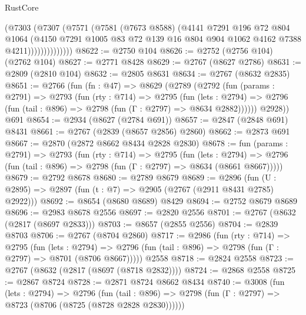 \begin{lexlean}{RustCore}
\begin{coremodule}
                    (@7303
                      (@7307
                        (@7571
                          (@7581
                            (@7673 @8588)
                            (@4141
                              @7291
                              @196
                              @72
                              @804
                              @1064
                              (@4150
                                @7291
                                @1005
                                @83
                                @72
                                @139
                                @16
                                @804
                                @904
                                @1062
                                @4162
                                @7388
                                @4211))))))))))))))
@8622 := @2750 @104
@8626 := @2752 (@2756 @104) (@2762 @104)
@8627 := @2771 @8428
@8629 := @2767 (@8627 @2786)
@8631 := @2809 (@2810 @104)
@8632 := @2805 @8631
@8634 := @2767 (@8632 @2835)
@8651 := @2766
    (fun (fn : @47) =>
    @8629
      (@2789
        (@2792
          (fun (params : @2791) =>
          @2793
            (fun (rty : @714) =>
            @2795
              (fun (lets : @2794) =>
              @2796 (fun (tail : @896) => @2798 (fun (Γ : @2797) => @8634 @2882))))))
        @2928))
    @691
@8654 := @2934 (@8627 (@2784 @691))
@8657 := @2847 (@2848 @691) @8431
@8661 := @2767 (@2839 (@8657 @2856) @2860)
@8662 := @2873 @691
@8667 := @2870 (@2872 @8662 @8434 @2828 @2830)
@8678 := fun (params : @2791) =>
  @2793
    (fun (rty : @714) =>
    @2795
      (fun (lets : @2794) =>
      @2796 (fun (tail : @896) => @2798 (fun (Γ : @2797) => @8634 (@8661 @8667)))))
@8679 := @2792 @8678
@8680 := @2789 @8679
@8689 := @2896 (fun (U : @2895) => @2897 (fun (t : @7) => @2905 (@2767 (@2911 @8431 @2785) @2922)))
@8692 := @8654 (@8680 @8689) @8429
@8694 := @2752 @8679 @8689
@8696 := @2983 @8678 @2556
@8697 := @2820 @2556
@8701 := @2767 (@8632 (@2817 (@8697 @2833)))
@8703 := @8657 (@2855 @2556)
@8704 := @2839 @8703
@8706 := @2767 (@8704 @2860)
@8717 := @2986
    (fun (rty : @714) =>
    @2795
      (fun (lets : @2794) =>
      @2796 (fun (tail : @896) => @2798 (fun (Γ : @2797) => @8701 (@8706 @8667)))))
    @2558
@8718 := @2824 @2558
@8723 := @2767 (@8632 (@2817 (@8697 (@8718 @2832))))
@8724 := @2868 @2558
@8725 := @2867 @8724
@8728 := @2871 @8724 @8662 @8434
@8740 := @3008
    (fun (lets : @2794) =>
    @2796
      (fun (tail : @896) => @2798 (fun (Γ : @2797) => @8723 (@8706 (@8725 (@8728 @2828 @2830))))))

\end{coremodule}
\end{lexlean}
